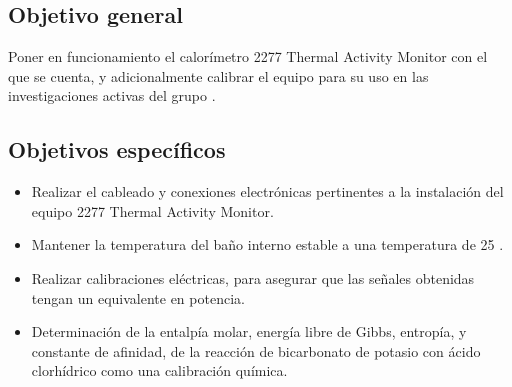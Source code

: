 	\subsection{Objetivo general}
		Poner en funcionamiento el calorímetro 2277 Thermal Activity Monitor con el que se cuenta, y adicionalmente calibrar el equipo para su uso en las investigaciones activas del grupo \groupname.
		
	\subsection{Objetivos específicos}
		\begin{itemize}
			\item Realizar el cableado y conexiones electrónicas pertinentes a la instalaci\'on del equipo 2277 Thermal Activity Monitor.
			\item Mantener la temperatura del ba\~no interno estable a una temperatura de 25 \grad{}.
			\item Realizar calibraciones eléctricas, para asegurar que las señales obtenidas tengan un equivalente en potencia.
			\item Determinación de la entalpía molar, energía libre de Gibbs, entropía, y constante de afinidad, de la reacci\'on de bicarbonato de potasio con \'acido clorh\'idrico como una calibración química.
		\end{itemize}
	
